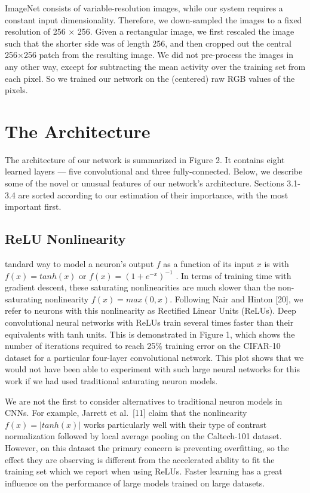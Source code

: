 \documentclass[12pt,a4paper,UTF8,twoside]{book}
\begin{document}
ImageNet consists of variable-resolution images, while our system requires a constant input dimensionality. Therefore, we down-sampled the images to a fixed resolution of 256 × 256. Given a rectangular image, we first rescaled the image such that the shorter side was of length 256, and then cropped out the central 256×256 patch from the resulting image. We did not pre-process the images in any other way, except for subtracting the mean activity over the training set from each pixel. So we trained our network on the (centered) raw RGB values of the pixels.

\hypertarget{the-architecture}{%
\section{The Architecture}\label{the-architecture}}

The architecture of our network is summarized in Figure 2. It contains eight learned layers --- five convolutional and three fully-connected. Below, we describe some of the novel or unusual features of our network's architecture. Sections 3.1-3.4 are sorted according to our estimation of their importance, with the most important first.

\hypertarget{relu-nonlinearity}{%
\subsection{ReLU Nonlinearity}\label{relu-nonlinearity}}

tandard way to model a neuron's output \(f\) as a function of its input \(x\) is with \(f(x) = tanh(x)\) or \(f(x) = (1 + e^{−x} )^{−1}\) . In terms of training time with gradient descent, these saturating nonlinearities are much slower than the non-saturating nonlinearity \(f(x) = max(0, x)\). Following Nair and Hinton {[}20{]}, we refer to neurons with this nonlinearity as Rectified Linear Units (ReLUs). Deep convolutional neural networks with ReLUs train several times faster than their equivalents with tanh units. This is demonstrated in Figure 1, which shows the number of iterations required to reach 25\% training error on the CIFAR-10 dataset for a particular four-layer convolutional network. This plot shows that we would not have been able to experiment with such large neural networks for this work if we had used traditional saturating neuron models.

We are not the first to consider alternatives to traditional neuron models in CNNs. For example, Jarrett et al.~{[}11{]} claim that the nonlinearity \(f(x) = |tanh(x)|\) works particularly well with their type of contrast normalization followed by local average pooling on the Caltech-101 dataset. However, on this dataset the primary concern is preventing overfitting, so the effect they are observing is different from the accelerated ability to fit the training set which we report when using ReLUs. Faster learning has a great influence on the performance of large models trained on large datasets.
\end{document}
